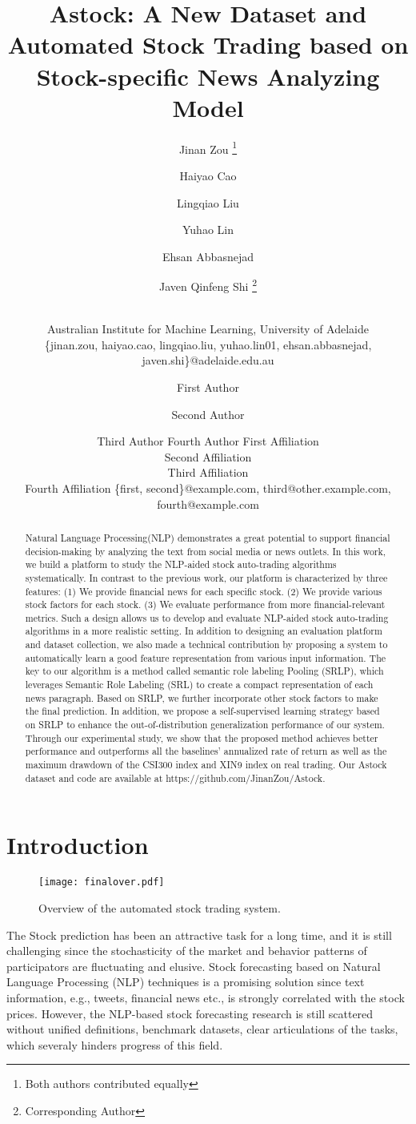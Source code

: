 \documentclass{article}
\title{Astock: A New Dataset and Automated Stock Trading based on Stock-specific News Analyzing Model}
\author{
Jinan Zou \footnote{Both authors contributed equally}\and
Haiyao Cao \footnotemark[1]\and
Lingqiao Liu\and
Yuhao Lin \and
Ehsan Abbasnejad \and
Javen Qinfeng Shi \footnote{Corresponding Author} \and
\\
\affiliations
Australian Institute for Machine Learning, University of Adelaide\\
\emails
\{jinan.zou, haiyao.cao, lingqiao.liu, yuhao.lin01, ehsan.abbasnejad, javen.shi\}@adelaide.edu.au
}
\author{
First Author
\and
Second Author\and
Third Author\And
Fourth Author
\affiliations
First Affiliation\\
Second Affiliation\\
Third Affiliation\\
Fourth Affiliation
\emails
\{first, second\}@example.com,
third@other.example.com,
fourth@example.com
}
\begin{document}
\maketitle

\begin{abstract}
Natural Language Processing(NLP) demonstrates a great potential to support financial decision-making by analyzing the text from social media or news outlets. In this work, we build a platform to study the NLP-aided stock auto-trading algorithms systematically. In contrast to the previous work, our platform is characterized by three features: (1) We provide financial news for each specific stock. (2) We provide various stock factors for each stock. (3) We evaluate performance from more financial-relevant metrics. Such a design allows us to develop and evaluate NLP-aided stock auto-trading algorithms in a more realistic setting. In addition to designing an evaluation platform and dataset collection, we also made a technical contribution by proposing a system to automatically learn a good feature representation from various input information. The key to our algorithm is a method called semantic role labeling Pooling (SRLP), which leverages Semantic Role Labeling (SRL) to create a compact representation of each news paragraph. Based on SRLP, we further incorporate other stock factors to make the final prediction. In addition, we propose a self-supervised learning strategy based on SRLP to enhance the out-of-distribution generalization performance of our system. Through our experimental study,  we show that the proposed method achieves better performance and outperforms all the baselines' annualized rate of return as well as the maximum drawdown of the CSI300 index and XIN9 index on real trading. Our Astock dataset and code are available at https://github.com/JinanZou/Astock.

\end{abstract}

\section{Introduction}
\begin{figure}[t]
\begin{center}  
   \texttt{[image: finalover.pdf]}
\end{center}
\caption{Overview of the automated stock trading system.}
\label{tradingsystem}
\end{figure}
The Stock prediction has been an attractive task for a long time, and it is still challenging since the stochasticity of the market and behavior patterns of participators are fluctuating and elusive. Stock forecasting based on Natural Language Processing (NLP) techniques is a promising solution since text information, e.g., tweets, financial news etc., is strongly correlated with the stock prices. However, the NLP-based stock forecasting research is still scattered without unified definitions, benchmark datasets, clear articulations of the tasks, which severaly hinders progress of this field.
\end{document}
